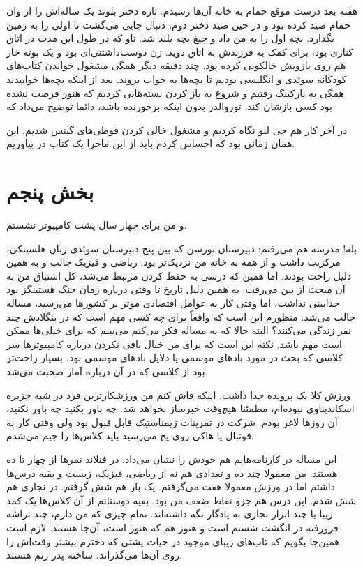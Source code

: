 \begin{journal}
هفته بعد درست موقع حمام به خانه آن‌ها رسیدم. تازه دختر بلوند یک ساله‌اش
را از وان حمام صید کرده بود و در حین صید دختر دوم، دنبال جایی می‌گشت تا
اولی را به زمین بگذارد. بچه اول را به من داد و جیغ بچه بلند شد. تاو که
در طول این مدت در اتاق کناری بود، برای کمک به فرزندش به اتاق دوید. زن
دوست‌داشتنی‌ای بود و یک بوته خار هم روی بازویش خالکوبی کرده بود. چند
دقیقه دیگر همگی مشغول خواندن کتاب‌های کودکانه سوئدی و انگلیسی بودیم تا
بچه‌ها به خواب بروند. بعد از اینکه بچه‌ها خوابیدند همگی به پارکینگ رفتیم
و شروع به باز کردن بسته‌هایی کردیم که هنوز فرصت نشده بود کسی بازشان
کند. توروالدز بدون اینکه برخورنده باشد، دائما توضیح می‌داد که

در آخر کار هم جی لنو نگاه کردیم و مشغول خالی کردن
قوطی‌های گینس
شدیم. این همان زمانی بود که احساس کردم باید از این ماجرا یک کتاب در
بیاوریم.
\end{journal}

\section{بخش پنجم}
و من برای چهار سال پشت کامپیوتر نشستم. 

بله!‌ مدرسه هم می‌رفتم: دبیرستان نورسن که بین پنج
دبیرستان سوئدی زبان هلسینکی، مرکزیت داشت و از همه به خانه من نزدیک‌تر
بود. ریاضی و فیزیک جالب و به همین دلیل راحت بودند. اما همین که درسی به
حفظ ‌کردن مرتبط می‌شد، کل اشتیاق من به آن مبحث از بین می‌رفت. به همین
دلیل تاریخ تا وقتی درباره زمان جنگ هستینگز بود جذابیتی نداشت، اما وقتی کار به عوامل اقتصادی موثر بر
کشورها می‌رسید، مساله جالب می‌شد. منظورم این است که واقعاً برای چه کسی
مهم است که در بنگلادش چند نفر زندگی می‌کنند؟ البته حالا که به مساله فکر
می‌کنم می‌بینم که برای خیلی‌ها ممکن است مهم باشد. نکته این است که برای من
خیال بافی نکردن درباره کامپیوترها سر کلاسی که بحث در مورد بادهای موسمی
یا دلایل بادهای موسمی بود، بسیار راحت‌تر بود از کلاسی که در آن درباره
آمار صحبت می‌شد.

ورزش کلا یک پرونده جدا داشت. اینکه فاش کنم من ورزشکارترین فرد در شبه
جزیره اسکاندیناوی نبوده‌ام، مطمئنا هیچ‌وقت خبرساز نخواهد شد. چه باور
بکنید چه باور نکنید، آن روزها لاغر بودم. شرکت در تمرینات ژیمناستیک
قابل قبول بود ولی وقتی کار به فوتبال یا هاکی روی یخ می‌رسید باید کلاس‌ها
را جیم‌ می‌شدم.

این مساله در کارنامه‌هایم هم خودش را نشان می‌داد. در فنلاند نمر‌ها از
چهار تا ده هستند. من معمولا چند ده و تعدادی هم نه از ریاضی، فیزیک،
زیست و بقیه درس‌ها داشتم اما در ورزش معمولا هفت می‌گرفتم. یک بار هم شش
گرفتم. در نجاری هم شش شدم. این درس هم جزو نقاط ضعف من بود. بقیه
دوستانم از آن کلاس‌ها یک کمد زیبا یا چند ابزار نجاری به یادگار نگه‌
داشته‌اند. تمام چیزی که من دارم، چند تراشه فرورفته در انگشت شستم است و
هنوز هم که هنوز است، آن‌جا هستند. لازم است همین‌جا بگویم که تاب‌های زیبای
موجود در حیات پشتی که دخترم بیشتر وقت‌اش را روی آن‌ها می‌گذراند، ساخته
پدر زنم هستند.

